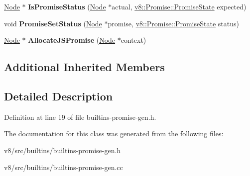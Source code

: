 \begin{DoxyCompactItemize}
\item 
\mbox{\label{classv8_1_1internal_1_1PromiseBuiltinsAssembler_ac914408a99b22f4793cca0f497b31f59}} 
\mbox{\hyperlink{classv8_1_1internal_1_1compiler_1_1Node}{Node}} $\ast$ {\bfseries Is\+Promise\+Status} (\mbox{\hyperlink{classv8_1_1internal_1_1compiler_1_1Node}{Node}} $\ast$actual, \mbox{\hyperlink{classv8_1_1Promise_a0c357b9d99a634f98a5a203b0a322544}{v8\+::\+Promise\+::\+Promise\+State}} expected)
\item 
\mbox{\label{classv8_1_1internal_1_1PromiseBuiltinsAssembler_a0a001c0bc8b4b5334db056600cc2fef4}} 
void {\bfseries Promise\+Set\+Status} (\mbox{\hyperlink{classv8_1_1internal_1_1compiler_1_1Node}{Node}} $\ast$promise, \mbox{\hyperlink{classv8_1_1Promise_a0c357b9d99a634f98a5a203b0a322544}{v8\+::\+Promise\+::\+Promise\+State}} status)
\item 
\mbox{\label{classv8_1_1internal_1_1PromiseBuiltinsAssembler_a116d67b7c8b8c7f8f0bcbea175348cf6}} 
\mbox{\hyperlink{classv8_1_1internal_1_1compiler_1_1Node}{Node}} $\ast$ {\bfseries Allocate\+J\+S\+Promise} (\mbox{\hyperlink{classv8_1_1internal_1_1compiler_1_1Node}{Node}} $\ast$context)
\end{DoxyCompactItemize}
\subsection*{Additional Inherited Members}


\subsection{Detailed Description}


Definition at line 19 of file builtins-\/promise-\/gen.\+h.



The documentation for this class was generated from the following files\+:\begin{DoxyCompactItemize}
\item 
v8/src/builtins/builtins-\/promise-\/gen.\+h\item 
v8/src/builtins/builtins-\/promise-\/gen.\+cc\end{DoxyCompactItemize}
